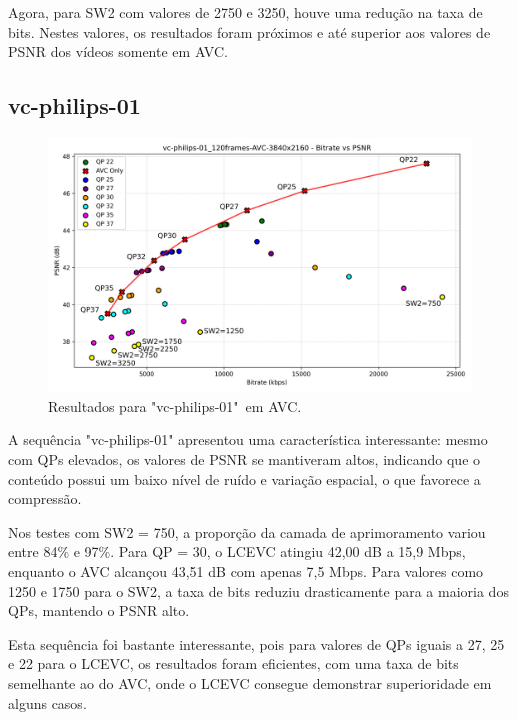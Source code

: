 Agora, para SW2 com valores de 2750 e 3250, houve uma redução na taxa de bits.
Nestes valores, os resultados foram próximos e até superior aos valores de \acrshort{PSNR}
dos vídeos somente em \acrshort{AVC}.

\newpage

\subsection{vc-philips-01}

\begin{figure}[h]
    \centering
    \includegraphics[width=1.0\textwidth]{img/vc-philips-01_120frames-AVC.png}
    \caption{Resultados para "vc-philips-01"\ em \acrshort{AVC}.}
    \label{fig:vc-philips-01}
\end{figure}

A sequência "vc-philips-01" apresentou uma característica interessante: mesmo
com QPs elevados, os valores de \acrshort{PSNR} se mantiveram altos, indicando
que o conteúdo possui um baixo nível de ruído e variação espacial, o que
favorece a compressão.

Nos testes com SW2 = 750, a proporção da camada de aprimoramento variou entre
84\% e 97\%. Para QP = 30, o \acrshort{LCEVC} atingiu 42,00 dB a 15,9 Mbps,
enquanto o \acrshort{AVC} alcançou 43,51 dB com apenas 7,5 Mbps. Para valores 
como 1250 e 1750 para o SW2, a taxa de bits reduziu drasticamente
para a maioria dos QPs, mantendo o \acrshort{PSNR} alto.

Esta sequência foi bastante interessante, pois para valores de QPs iguais
a 27, 25 e 22 para o \acrshort{LCEVC}, os resultados foram eficientes,
com uma taxa de bits semelhante ao do \acrshort{AVC}, onde o \acrshort{LCEVC}
consegue demonstrar superioridade em alguns casos. 

